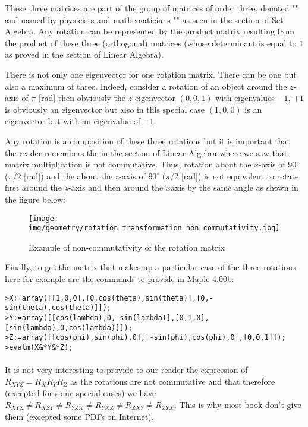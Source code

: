 	These three matrices are part of the group of matrices of order three, denoted "" and named by physicists and mathematicians "" as seen in the section of Set Algebra. Any rotation can be represented by the product matrix resulting from the product of these three (orthogonal) matrices (whose determinant is equal to $1$ as proved in the section of Linear Algebra).
	\begin{tcolorbox}[title=Remark,colframe=black,arc=10pt]
	There is not only one eigenvector for one rotation matrix. There can be one but also a maximum of three. Indeed, consider a rotation of an object around the $z$-axis of $\pi$ [rad] then obviously the $z$ eigenvector $(0,0,1)$ with eigenvalues $-1$, $+1$ is obviously an eigenvector but also in this special case $(1,0,0)$ is an eigenvector but with an eigenvalue of $-1$.
	\end{tcolorbox}
	Any rotation is a composition of these three rotations but it is important that the reader remembers the in the section of Linear Algebra where we saw that matrix multiplication is not commutative. Thus, rotation about the $x$-axis of $90^\circ$ ($\pi/2$ [rad]) and the about the $z$-axis of  $90^\circ$ ($\pi/2$ [rad]) is not equivalent to rotate first around the $z$-axis and then around the $x$axis by the same angle as shown in the figure below:
	\begin{figure}[H]
		\centering
		\texttt{[image: img/geometry/rotation\_transformation\_non\_commutativity.jpg]}
		\caption{Example of non-commutativity of the rotation matrix}
	\end{figure}
	Finally, to get the matrix that makes up a particular case of the three rotations here for example are the commands to provide in Maple 4.00b:
	
	\texttt{>X:=array([[1,0,0],[0,cos(theta),sin(theta)],[0,-sin(theta),cos(theta)]]);\\
	>Y:=array([[cos(lambda),0,-sin(lambda)],[0,1,0],[sin(lambda),0,cos(lambda)]]);\\
	>Z:=array([[cos(phi),sin(phi),0],[-sin(phi),cos(phi),0],[0,0,1]]);
	>evalm(X\&*Y\&*Z);\\
	}\\
	It is not very interesting to provide to our reader the expression of $R_{XYZ}=R_XR_YR_Z$ as the rotations are not commutative and that therefore (excepted for some special cases) we have $R_{XYZ}\neq R_{XZY}\neq R_{YZX}\neq R_{YXZ}\neq R_{ZXY}\neq R_{ZYX}$. This is why most book don't give them (excepted some PDFs on Internet).
	
